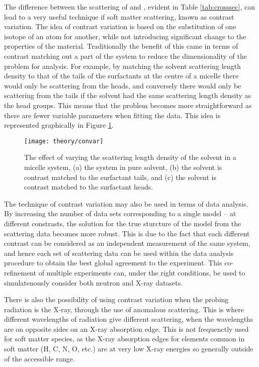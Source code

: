 %
The difference between the scattering of  and , evident in Table \ref{tab:crosssec}, can lead to a very useful technique if soft matter scattering, known as contrast variation. The idea of contrast variation is based on the substitution of one isotope of an atom for another, while not introducing significant change to the properties of the material. Traditionally the benefit of this came in terms of contrast matching out a part of the system to reduce the dimensionality of the problem for analysis. For example, by matching the solvent scattering length density to that of the tails of the surfactants at the centre of a micelle there would only be scattering from the heads, and conversely there would only be scattering from the tails if the solvent had the same scattering length density as the head groups. This means that the problem becomes more straightforward as there are fewer variable parameters when fitting the data. This idea is represented graphically in Figure \ref{fig:convar}.
%
\begin{figure}
	\centering
	\texttt{[image: theory/convar]}
	\caption{The effect of varying the scattering length density of the solvent in a micelle system, (a) the system in pure solvent, (b) the solvent is contrast matched to the surfactant tails, and (c) the solvent is contrast matched to the surfactant heads.}
	\label{fig:convar}
\end{figure}
%
The technique of contrast variation may also be used in terms of data analysis. By increasing the number of data sets corresponding to a single model -- at different constrasts, the solution for the true sturcture of the model from the scattering data becomes more robust. This is due to the fact that each different contrast can be considered as an independent measurement of the same system, and hence each set of scattering data can be used within the data analysis procedure to obtain the best global agreement to the experiment. This co-refinement of multiple experiments can, under the right conditions, be used to simulatenously consider both neutron and X-ray datasets.\cite{Nelson2006}

There is also the possibility of using contrast variation when the probing radiation is the X-ray, through the use of anomalous scattering. This is where different wavelengths of radiation give different scattering, when the wavelengths are on opposite sides on an X-ray absorption edge. This is not frequenctly used for soft matter species, as the X-ray absorption edges for elements common in soft matter (H, C, N, O, etc.) are at very low X-ray energies so generally outside of the accessible range. \cite{Schurtenberger2002}
